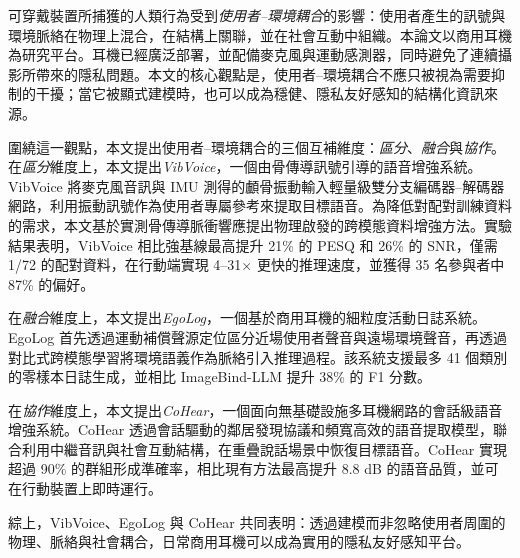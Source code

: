 \documentclass[11pt]{gsasthesis} %
\begin{document}
\begin{abstract}
Together, these systems show how earphone-class head-mounted wearables can become privacy-preserving sensing platforms by modeling, rather than ignoring, the physical, contextual, and social coupling around the user.

\end{abstract}

\begin{cabstract}
可穿戴裝置所捕獲的人類行為受到\textit{使用者--環境耦合}的影響：使用者產生的訊號與環境脈絡在物理上混合，在結構上關聯，並在社會互動中組織。本論文以商用耳機為研究平台。耳機已經廣泛部署，並配備麥克風與運動感測器，同時避免了連續攝影所帶來的隱私問題。本文的核心觀點是，使用者--環境耦合不應只被視為需要抑制的干擾；當它被顯式建模時，也可以成為穩健、隱私友好感知的結構化資訊來源。

圍繞這一觀點，本文提出使用者--環境耦合的三個互補維度：\textit{區分}、\textit{融合}與\textit{協作}。在\textit{區分}維度上，本文提出\textit{VibVoice}，一個由骨傳導訊號引導的語音增強系統。VibVoice 將麥克風音訊與 IMU 測得的顱骨振動輸入輕量級雙分支編碼器--解碼器網路，利用振動訊號作為使用者專屬參考來提取目標語音。為降低對配對訓練資料的需求，本文基於實測骨傳導脈衝響應提出物理啟發的跨模態資料增強方法。實驗結果表明，VibVoice 相比強基線最高提升 21\% 的 PESQ 和 26\% 的 SNR，僅需 1/72 的配對資料，在行動端實現 4--31$\times$ 更快的推理速度，並獲得 35 名參與者中 87\% 的偏好。

在\textit{融合}維度上，本文提出\textit{EgoLog}，一個基於商用耳機的細粒度活動日誌系統。EgoLog 首先透過運動補償聲源定位區分近場使用者聲音與遠場環境聲音，再透過對比式跨模態學習將環境語義作為脈絡引入推理過程。該系統支援最多 41 個類別的零樣本日誌生成，並相比 ImageBind-LLM 提升 38\% 的 F1 分數。

在\textit{協作}維度上，本文提出\textit{CoHear}，一個面向無基礎設施多耳機網路的會話級語音增強系統。CoHear 透過會話驅動的鄰居發現協議和頻寬高效的語音提取模型，聯合利用中繼音訊與社會互動結構，在重疊說話場景中恢復目標語音。CoHear 實現超過 90\% 的群組形成準確率，相比現有方法最高提升 8.8 dB 的語音品質，並可在行動裝置上即時運行。

綜上，VibVoice、EgoLog 與 CoHear 共同表明：透過建模而非忽略使用者周圍的物理、脈絡與社會耦合，日常商用耳機可以成為實用的隱私友好感知平台。

\end{cabstract}

\renewcommand{\contentsname}{\protect\centering\protect\Large Contents}
\renewcommand{\listtablename}{\protect\centering\protect\Large List of Tables}
\renewcommand{\listfigurename}{\protect\centering\protect\Large List of Figures}
\end{document}
